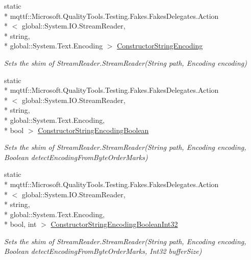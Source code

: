 \begin{DoxyCompactItemize}
static \\*
mqttf\-::\-Microsoft.\-Quality\-Tools.\-Testing.\-Fakes.\-Fakes\-Delegates.\-Action\\*
$<$ global\-::\-System.\-I\-O.\-Stream\-Reader, \\*
string, \\*
global\-::\-System.\-Text.\-Encoding $>$ \hyperlink{class_system_1_1_i_o_1_1_fakes_1_1_shim_stream_reader_a4dae3f6cacbf11c7d9989e50cef8a877}{Constructor\-String\-Encoding}
\begin{DoxyCompactList}\small\item\em Sets the shim of Stream\-Reader.\-Stream\-Reader(\-String path, Encoding encoding)\end{DoxyCompactList}\item 
static \\*
mqttf\-::\-Microsoft.\-Quality\-Tools.\-Testing.\-Fakes.\-Fakes\-Delegates.\-Action\\*
$<$ global\-::\-System.\-I\-O.\-Stream\-Reader, \\*
string, \\*
global\-::\-System.\-Text.\-Encoding, \\*
bool $>$ \hyperlink{class_system_1_1_i_o_1_1_fakes_1_1_shim_stream_reader_a985c02fb6e44d5e7ae7f5c30f508eb90}{Constructor\-String\-Encoding\-Boolean}
\begin{DoxyCompactList}\small\item\em Sets the shim of Stream\-Reader.\-Stream\-Reader(\-String path, Encoding encoding, Boolean detect\-Encoding\-From\-Byte\-Order\-Marks)\end{DoxyCompactList}\item 
static \\*
mqttf\-::\-Microsoft.\-Quality\-Tools.\-Testing.\-Fakes.\-Fakes\-Delegates.\-Action\\*
$<$ global\-::\-System.\-I\-O.\-Stream\-Reader, \\*
string, \\*
global\-::\-System.\-Text.\-Encoding, \\*
bool, int $>$ \hyperlink{class_system_1_1_i_o_1_1_fakes_1_1_shim_stream_reader_a14bc1e4606fa7048675cb000c4acb876}{Constructor\-String\-Encoding\-Boolean\-Int32}
\begin{DoxyCompactList}\small\item\em Sets the shim of Stream\-Reader.\-Stream\-Reader(\-String path, Encoding encoding, Boolean detect\-Encoding\-From\-Byte\-Order\-Marks, Int32 buffer\-Size)\end{DoxyCompactList}\item 

\end{DoxyCompactItemize}
